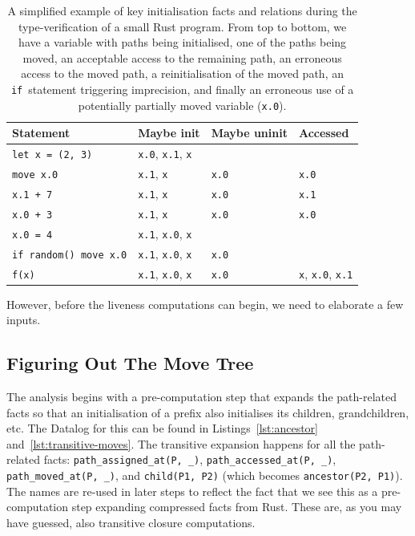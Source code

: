 \documentclass[11pt,a4paper,twoside,openany]{report}
\newcommand{\InRust}[1]{\texttt{#1}}
\newcommand{\InDatalog}[1]{\texttt{#1}}
\begin{document}
{\renewcommand{\arraystretch}{1.0}
  \begin{table}    
\begin{tabular}{@{}l l l l}
  Statement                & Maybe init                 & Maybe uninit            & Accessed \\ \toprule
  \InRust{let x = (2, 3)} & \InRust{x.0}, \InRust{x.1}, \InRust{x} &  & \\
  \InRust{move x.0}        & \InRust{x.1}, \InRust{x}               & \InRust{x.0} & \InRust{x.0} \\ %
  \InRust{x.1 + 7}         & \InRust{x.1}, \InRust{x}               & \InRust{x.0} & \InRust{x.1} \\ %
  \InRust{x.0 + 3}         & \InRust{x.1}, \InRust{x}               & \InRust{x.0} & \InRust{x.0} \\ %
  \InRust{x.0 = 4}         & \InRust{x.1}, \InRust{x.0}, \InRust{x} &   \\ %
  \InRust{if random() {move x.0}}  & \InRust{x.1}, \InRust{x.0}, \InRust{x} & \InRust{x.0}        \\ %
  \InRust{f(x)}  & \InRust{x.1}, \InRust{x.0}, \InRust{x} & \InRust{x.0} & \InRust{x}, \InRust{x.0}, \InRust{x.1}       \\ %
\end{tabular}
\caption[Move Error Example]{A simplified example of key initialisation facts
  and relations during the type-verification of a small Rust program. From top
  to bottom, we have a variable with paths being initialised, one of the paths
  being moved, an acceptable access to the remaining path, an erroneous access
  to the moved path, a reinitialisation of the moved path, an
  \InRust{if}~statement triggering imprecision, and finally an erroneous use of
  a potentially partially moved variable
  (\InRust{x.0}).}\label{tab:move-example}
\end{table}%
 }

However, before the liveness computations can begin, we need to elaborate a few
inputs.

\subsection{Figuring Out The Move Tree}\label{sec:move:fixpoints}

The analysis begins with a pre-computation step that expands the path-related
facts so that an initialisation of a prefix also initialises its children,
grandchildren, etc. The Datalog for this can be found in
Listings~\ref{lst:ancestor} and~\ref{lst:transitive-moves}. The transitive
expansion happens for all the path-related facts: \InDatalog{path_assigned_at(P,
  _)}, \InDatalog{path_accessed_at(P, _)}, \InDatalog{path_moved_at(P, _)}, and
\InDatalog{child(P1, P2)} (which becomes \InDatalog{ancestor(P2, P1)}). The
names are re-used in later steps to reflect the fact that we see this as a
pre-computation step expanding compressed facts from Rust. These are, as you may
have guessed, also transitive closure computations.
\end{document}
